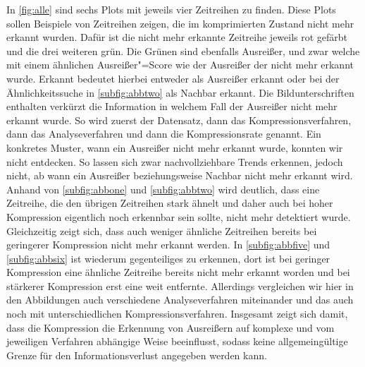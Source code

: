 In \autoref{fig:alle} sind sechs Plots mit jeweils vier Zeitreihen zu finden. Diese Plots sollen Beispiele von Zeitreihen zeigen, die im komprimierten Zustand nicht mehr erkannt wurden. Dafür ist die nicht mehr erkannte Zeitreihe jeweils rot gefärbt und die drei weiteren grün. Die Grünen sind ebenfalls Ausreißer, und zwar welche mit einem ähnlichen Ausreißer"=Score wie der Ausreißer der nicht mehr erkannt wurde. Erkannt bedeutet hierbei entweder als Ausreißer erkannt oder bei der Ähnlichkeitssuche in \autoref{subfig:abbtwo} als Nachbar erkannt. Die Bildunterschriften enthalten verkürzt die Information in welchem Fall der Ausreißer nicht mehr erkannt wurde. So wird zuerst der Datensatz, dann das Kompressionsverfahren, dann das Analyseverfahren und dann die Kompressionsrate genannt. Ein konkretes Muster, wann ein Ausreißer nicht mehr erkannt wurde, konnten wir nicht entdecken. So lassen sich zwar nachvollziehbare Trends erkennen, jedoch nicht, ab wann ein Ausreißer beziehungsweise Nachbar nicht mehr erkannt wird. Anhand von \autoref{subfig:abbone} und \autoref{subfig:abbtwo} wird deutlich, dass eine Zeitreihe, die den übrigen Zeitreihen stark ähnelt und daher auch bei hoher Kompression eigentlich noch erkennbar sein sollte, nicht mehr detektiert wurde. Gleichzeitig zeigt sich, dass auch weniger ähnliche Zeitreihen bereits bei geringerer Kompression nicht mehr erkannt werden. In \autoref{subfig:abbfive} und \autoref{subfig:abbsix} ist wiederum gegenteiliges zu erkennen, dort ist bei geringer Kompression eine ähnliche Zeitreihe bereits nicht mehr erkannt worden und bei stärkerer Kompression erst eine weit entfernte. Allerdings vergleichen wir hier in den Abbildungen auch verschiedene Analyseverfahren miteinander und das auch noch mit unterschiedlichen Kompressionsverfahren. Insgesamt zeigt sich damit, dass die Kompression die Erkennung von Ausreißern auf komplexe und vom jeweiligen Verfahren abhängige Weise beeinflusst, sodass keine allgemeingültige Grenze für den Informationsverlust angegeben werden kann.

